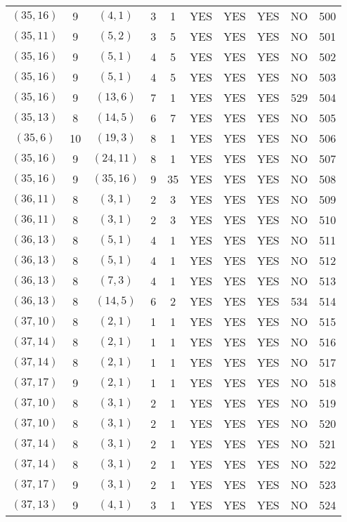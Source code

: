 \begin{longtable}{|c|c|c|c|c|c|c|c|c|c|}
$(35, 16)$ & 9 & $(4, 1)$ & 3 & 1 & YES & YES & YES & NO & 500\\
$(35, 11)$ & 9 & $(5, 2)$ & 3 & 5 & YES & YES & YES & NO & 501\\
$(35, 16)$ & 9 & $(5, 1)$ & 4 & 5 & YES & YES & YES & NO & 502\\
$(35, 16)$ & 9 & $(5, 1)$ & 4 & 5 & YES & YES & YES & NO & 503\\
$(35, 16)$ & 9 & $(13, 6)$ & 7 & 1 & YES & YES & YES & 529 & 504\\
$(35, 13)$ & 8 & $(14, 5)$ & 6 & 7 & YES & YES & YES & NO & 505\\
$(35, 6)$ & 10 & $(19, 3)$ & 8 & 1 & YES & YES & YES & NO & 506\\
$(35, 16)$ & 9 & $(24, 11)$ & 8 & 1 & YES & YES & YES & NO & 507\\
$(35, 16)$ & 9 & $(35, 16)$ & 9 & 35 & YES & YES & YES & NO & 508\\
$(36, 11)$ & 8 & $(3, 1)$ & 2 & 3 & YES & YES & YES & NO & 509\\
$(36, 11)$ & 8 & $(3, 1)$ & 2 & 3 & YES & YES & YES & NO & 510\\
$(36, 13)$ & 8 & $(5, 1)$ & 4 & 1 & YES & YES & YES & NO & 511\\
$(36, 13)$ & 8 & $(5, 1)$ & 4 & 1 & YES & YES & YES & NO & 512\\
$(36, 13)$ & 8 & $(7, 3)$ & 4 & 1 & YES & YES & YES & NO & 513\\
$(36, 13)$ & 8 & $(14, 5)$ & 6 & 2 & YES & YES & YES & 534 & 514\\
$(37, 10)$ & 8 & $(2, 1)$ & 1 & 1 & YES & YES & YES & NO & 515\\
$(37, 14)$ & 8 & $(2, 1)$ & 1 & 1 & YES & YES & YES & NO & 516\\
$(37, 14)$ & 8 & $(2, 1)$ & 1 & 1 & YES & YES & YES & NO & 517\\
$(37, 17)$ & 9 & $(2, 1)$ & 1 & 1 & YES & YES & YES & NO & 518\\
$(37, 10)$ & 8 & $(3, 1)$ & 2 & 1 & YES & YES & YES & NO & 519\\
$(37, 10)$ & 8 & $(3, 1)$ & 2 & 1 & YES & YES & YES & NO & 520\\
$(37, 14)$ & 8 & $(3, 1)$ & 2 & 1 & YES & YES & YES & NO & 521\\
$(37, 14)$ & 8 & $(3, 1)$ & 2 & 1 & YES & YES & YES & NO & 522\\
$(37, 17)$ & 9 & $(3, 1)$ & 2 & 1 & YES & YES & YES & NO & 523\\
$(37, 13)$ & 9 & $(4, 1)$ & 3 & 1 & YES & YES & YES & NO & 524\\

\end{longtable}
